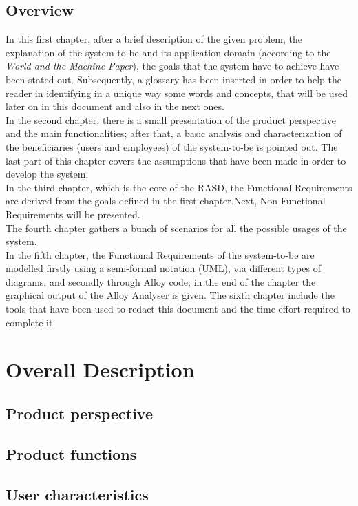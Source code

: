 \documentclass[11pt,a4paper]{report}
\begin{document}
\section{Overview}
In this first chapter, after a brief description of the given problem, the explanation of the system-to-be and its application domain (according to the \textit{World and the Machine Paper}), the goals that the system have to achieve have been stated out.
Subsequently, a glossary has been inserted in order to help the reader in identifying in a unique way some words and concepts, that will be used later on in this document and also in the next ones.\\
In the second chapter, there is a small presentation of the product perspective and the main functionalities; after that, a basic analysis and characterization of the beneficiaries (users and employees) of the system-to-be is pointed out. The last part of this chapter covers the assumptions that have been made in order to develop the system.\\
In the third chapter, which is the core of the RASD, the Functional Requirements are derived from the goals defined in the first chapter.Next, Non Functional Requirements will be presented.\\
The fourth chapter gathers a bunch of scenarios for all the possible usages of the system.\\
In the fifth chapter, the Functional Requirements of the system-to-be are modelled firstly using a semi-formal notation (UML), via different types of diagrams, and secondly through Alloy code; in the end of the chapter the graphical output of the Alloy Analyser is given.
The sixth chapter include the tools that have been used to redact this document and the time effort required to complete it.
\chapter{Overall Description}
\section{Product perspective}
\section{Product functions}
\section{User characteristics}
\end{document}
